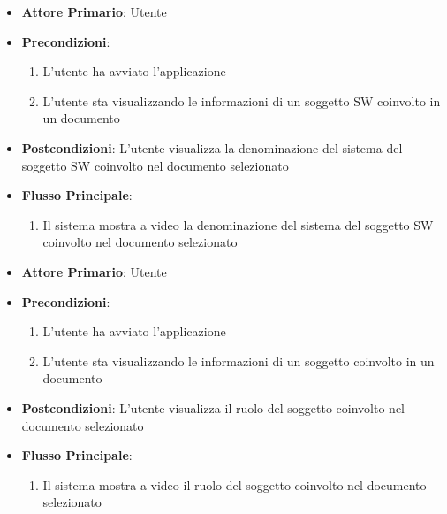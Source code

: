 \begin{itemize}
    \item \textbf{Attore Primario}: Utente
    \item \textbf{Precondizioni}:
    \begin{enumerate}
        \item L'utente ha avviato l'applicazione
        \item L'utente sta visualizzando le informazioni di un soggetto SW coinvolto in un documento
    \end{enumerate}
    \item \textbf{Postcondizioni}: L'utente visualizza la denominazione del sistema del soggetto SW coinvolto nel documento selezionato
    \item \textbf{Flusso Principale}:
        \begin{enumerate}
            \item Il sistema mostra a video la denominazione del sistema del soggetto SW coinvolto nel documento selezionato
        \end{enumerate}
\end{itemize}

\begin{itemize}
    \item \textbf{Attore Primario}: Utente
    \item \textbf{Precondizioni}:
    \begin{enumerate}
        \item L'utente ha avviato l'applicazione
        \item L'utente sta visualizzando le informazioni di un soggetto coinvolto in un documento
    \end{enumerate}
    \item \textbf{Postcondizioni}: L'utente visualizza il ruolo del soggetto coinvolto nel documento selezionato
    \item \textbf{Flusso Principale}:
        \begin{enumerate}
            \item Il sistema mostra a video il ruolo del soggetto coinvolto nel documento selezionato
        \end{enumerate}
\end{itemize}

